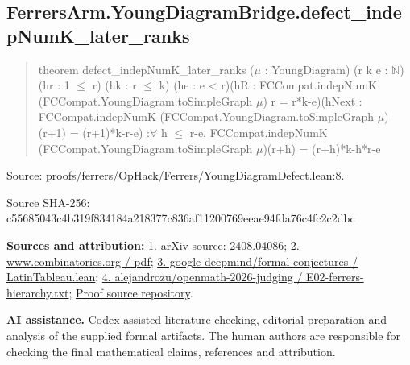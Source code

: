\documentclass[11pt,a4paper]{article}
\begin{document}
\begin{samepage}
\subsection{FerrersArm.YoungDiagramBridge.defect\_indepNumK\_later\_ranks}
\begin{quote}\small\ttfamily theorem defect\_indepNumK\_later\_ranks (\ensuremath{\mu} : YoungDiagram) (r k e : \ensuremath{\mathbb{N}})\newline     (hr : 1 \ensuremath{\leq} r) (hk : r \ensuremath{\leq} k) (he : e < r)\newline     (hR : FCCompat.indepNumK (FCCompat.YoungDiagram.toSimpleGraph \ensuremath{\mu}) r = r*k-e)\newline     (hNext : FCCompat.indepNumK (FCCompat.YoungDiagram.toSimpleGraph \ensuremath{\mu})\newline       (r+1) = (r+1)*k-r-e) :\newline     \ensuremath{\forall} h \ensuremath{\leq} r-e, FCCompat.indepNumK (FCCompat.YoungDiagram.toSimpleGraph \ensuremath{\mu})\newline       (r+h) = (r+h)*k-h*r-e\end{quote}
{\small Source: proofs/ferrers/OpHack/Ferrers/YoungDiagramDefect.lean:8.\par}

{\small Source SHA-256: c55685043c4b319f834184a218377c836af11200769eeae94fda76c4fc2c2dbc\par}

{\small\textbf{Sources and attribution:} \href{https://arxiv.org/abs/2408.04086}{1. arXiv source: 2408.04086}; \href{https://www.combinatorics.org/ojs/index.php/eljc/article/download/v32i2p48/pdf/}{2. www.combinatorics.org / pdf}; \href{https://github.com/google-deepmind/formal-conjectures/blob/main/FormalConjectures/Paper/LatinTableau.lean}{3. google-deepmind/formal-conjectures / LatinTableau.lean}; \href{https://github.com/alejandrozu/openmath-2026-judging/blob/d0ed487f487fa7ec814ff705ab55249983fe8707/OpenMath-Judging/review/entries/E02-ferrers-hierarchy.txt}{4. alejandrozu/openmath-2026-judging / E02-ferrers-hierarchy.txt}; \href{https://github.com/alejandrozu/openmath-2026-judging}{Proof source repository}.\par}

\end{samepage}
{\small \textbf{AI assistance.} Codex assisted literature checking, editorial preparation and analysis of the supplied formal artifacts. The human authors are responsible for checking the final mathematical claims, references and attribution.\par}
\end{document}
